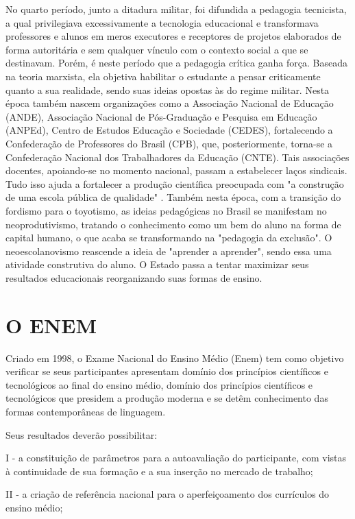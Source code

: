 	No quarto período, junto a ditadura militar, foi difundida a pedagogia tecnicista, a qual privilegiava excessivamente a tecnologia educacional e transformava professores e alunos em meros executores e receptores de projetos elaborados de forma autoritária e sem qualquer vínculo com o contexto social a que se destinavam. Porém, é neste período que a pedagogia crítica ganha força. Baseada na teoria marxista, ela objetiva habilitar o estudante a pensar criticamente quanto a sua realidade, sendo suas ideias opostas às do regime militar. Nesta época também nascem organizações como a Associação Nacional de Educação (ANDE), Associação Nacional de Pós-Graduação e Pesquisa em Educação (ANPEd), Centro de Estudos Educação e Sociedade (CEDES), fortalecendo a Confederação de Professores do Brasil (CPB), que, posteriormente, torna-se a Confederação Nacional dos Trabalhadores da Educação (CNTE). Tais associações docentes, apoiando-se no momento nacional, passam a estabelecer laços sindicais. Tudo isso ajuda a fortalecer a produção científica preocupada com "a construção de uma escola pública de qualidade" . Também nesta época, com a transição do fordismo para o toyotismo, as ideias pedagógicas no Brasil se manifestam no neoprodutivismo, tratando o conhecimento como um bem do aluno na forma de capital humano, o que acaba se transformando na "pedagogia da exclusão". O neoescolanovismo reascende a ideia de "aprender a aprender", sendo essa uma atividade construtiva do aluno. O Estado passa a tentar maximizar seus resultados educacionais reorganizando suas formas de ensino.

	\section{O ENEM}

	Criado em 1998, o Exame Nacional do Ensino Médio (Enem) tem como objetivo verificar se seus participantes apresentam domínio dos princípios científicos e tecnológicos ao final do ensino médio, domínio dos princípios científicos e tecnológicos que presidem a produção moderna e se detêm conhecimento das formas contemporâneas de linguagem. 

	Seus resultados deverão possibilitar: 

	I - a constituição de parâmetros para a autoavaliação do participante, com vistas à continuidade de sua formação e a sua inserção no mercado de trabalho; 

	II - a criação de referência nacional para o aperfeiçoamento dos currículos do ensino médio; 

